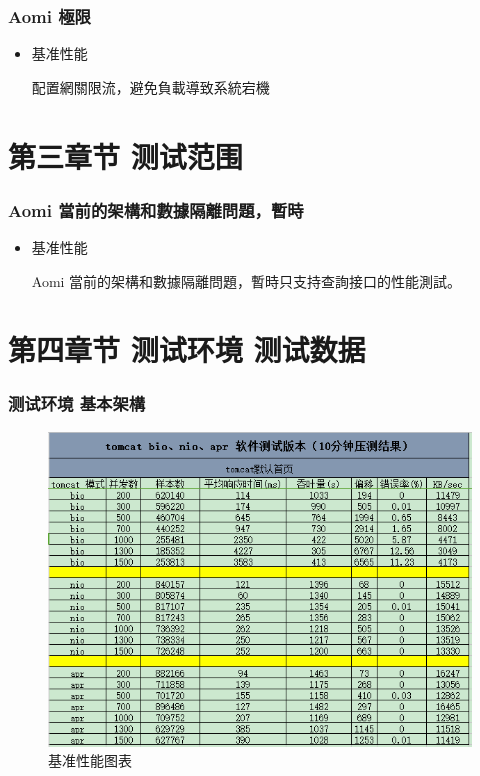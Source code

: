 \documentclass{beamer}
\begin{document}
\begin{frame}
\frametitle{Aomi 極限}
\begin{itemize}
	\item 基准性能
	\small
	
	
	配置網關限流，避免負載導致系統宕機
	
	
	
	
\end{itemize}
\end{frame}



\section{第三章节 测试范围}



\begin{frame}
\frametitle{Aomi 當前的架構和數據隔離問題，暫時}
\begin{itemize}
	\item 基准性能
	\small
	
	
	Aomi 當前的架構和數據隔離問題，暫時只支持查詢接口的性能測試。
	
	
	
	
\end{itemize}
\end{frame}






\section{第四章节 测试环境 测试数据}

\begin{frame}
\frametitle{测试环境 基本架構}
\begin{figure}[ht]
	
	\centering
	\includegraphics[scale=0.45]{img/benchmark.png}
	\caption{基准性能图表}
	\label{fig:pathdemo1}
\end{figure}

\end{frame}
\end{document}
